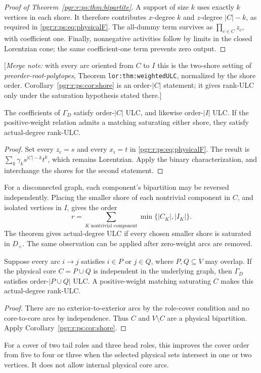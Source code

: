 \documentclass[11pt]{article}
\numberwithin{equation}{section}
\theoremstyle{definition}\newtheorem{definition}[theorem]{Definition}\newtheorem{remark}[theorem]{Remark}
\newcommand{\Ga}{\Gamma}                   %
\newcommand{\mnote}[1]{[\textit{Merge note:} #1]}
\newcommand{\prp}{\emph{preorder-root-polytopes}}
\begin{document}
\begin{proof}[Proof of Theorem~\ref{pgr:r:ps:thm:bipartite}]
A support of size $k$ uses exactly $k$ vertices in each shore. It therefore contributes $x$-degree $k$ and $z$-degree $|C|-k$, as required in \eqref{pgr:r:ps:eq:physicalF}. The all-dummy term survives as $\prod_{c\in C}z_c$, with coefficient one. Finally, nonnegative activities follow by limits in the closed Lorentzian cone; the same coefficient-one term prevents zero output.
\end{proof}


\mnote{with every arc oriented from $C$ to $I$ this is the two-shore
setting of \prp, Theorem \texttt{lor:thm:weightedULC}, normalized by the
shore order. Corollary~\ref{pgr:r:ps:cor:shore} is an order-$|C|$
statement; it gives rank-ULC only under the saturation hypothesis stated
there.}

\begin{corollary}\label{pgr:r:ps:cor:shore}
The coefficients of $\Ga_D$ satisfy order-$|C|$ ULC, and likewise order-$|I|$ ULC. If the positive-weight relation admits a matching saturating either shore, they satisfy actual-degree rank-ULC.
\end{corollary}
\begin{proof}
Set every $z_c=s$ and every $x_i=t$ in \eqref{pgr:r:ps:eq:physicalF}. The result is
$\sum_k\gamma_ks^{|C|-k}t^k$, which remains Lorentzian. Apply the binary characterization, and interchange the shores for the second statement.
\end{proof}

For a disconnected graph, each component's bipartition may be reversed independently. Placing the smaller shore of each nontrivial component in $C$, and isolated vertices in $I$, gives the order
\begin{equation}\label{pgr:r:ps:eq:componentorder}
 r=\sum_{K\text{ nontrivial component}}\min\{|C_K|,|I_K|\}.
\end{equation}
The theorem gives actual-degree ULC if every chosen smaller shore is saturated in $D_+$. The same observation can be applied after zero-weight arcs are removed.

\begin{corollary}\label{pgr:r:ps:cor:overlap}
Suppose every arc $i\to j$ satisfies $i\in P$ or $j\in Q$, where $P,Q\subseteq V$ may overlap. If the physical core $C=P\cup Q$ is independent in the underlying graph, then $\Ga_D$ satisfies order-$|P\cup Q|$ ULC. A positive-weight matching saturating $C$ makes this actual-degree rank-ULC.
\end{corollary}
\begin{proof}
There are no exterior-to-exterior arcs by the role-cover condition and no core-to-core arcs by independence. Thus $C$ and $V\setminus C$ are a physical bipartition. Apply Corollary~\ref{pgr:r:ps:cor:shore}.
\end{proof}
For a cover of two tail roles and three head roles, this improves the cover order from five to four or three when the selected physical sets intersect in one or two vertices. It does not allow internal physical core arcs.
\end{document}
